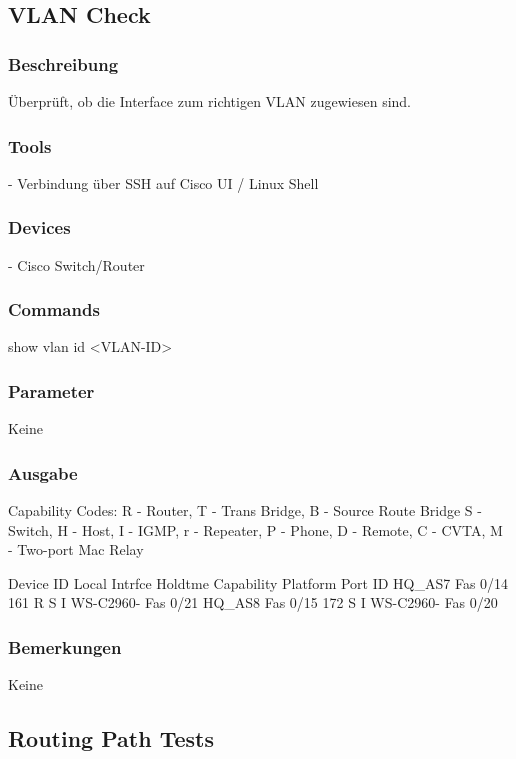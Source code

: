 \documentclass[a4,12pt]{scrartcl}
\begin{document}
\subsection{VLAN Check}
\subsubsection{Beschreibung}
Überprüft, ob die Interface zum richtigen VLAN zugewiesen sind.
\subsubsection{Tools}
- Verbindung über SSH auf Cisco UI / Linux Shell
\subsubsection{Devices}
- Cisco Switch/Router
\subsubsection{Commands}
show vlan id <VLAN-ID>
\subsubsection{Parameter}
Keine
\subsubsection{Ausgabe}
Capability Codes: R - Router, T - Trans Bridge, B - Source Route Bridge\newline
                  S - Switch, H - Host, I - IGMP, r - Repeater, P - Phone,\newline
                  D - Remote, C - CVTA, M - Two-port Mac Relay\newline

Device ID        Local Intrfce     Holdtme    Capability  Platform  Port ID\newline
HQ_AS7           Fas 0/14          161             R S I  WS-C2960- Fas 0/21\newline
HQ_AS8           Fas 0/15          172              S I   WS-C2960- Fas 0/20\newline
\subsubsection{Bemerkungen}
Keine

\subsection{Routing Path Tests}
\end{document}
